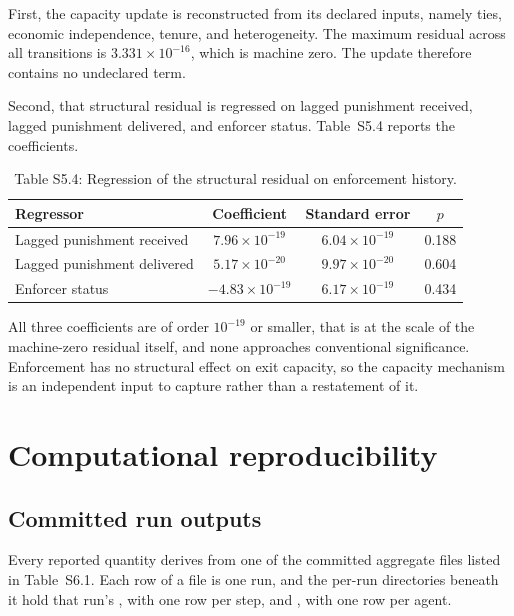 \documentclass[12pt]{article}
\begin{document}
First, the capacity update is reconstructed from its declared inputs, namely
ties, economic independence, tenure, and heterogeneity. The maximum residual
across all transitions is $3.331\times10^{-16}$, which is machine zero. The
update therefore contains no undeclared term.

Second, that structural residual is regressed on lagged punishment received,
lagged punishment delivered, and enforcer status. Table~S5.4 reports the
coefficients.

\begin{table}[htbp]
\centering
\small
\caption{Table S5.4: Regression of the structural residual on enforcement history.}
\begin{tabular}{lccc}
\toprule
Regressor & Coefficient & Standard error & $p$ \\
\midrule
Lagged punishment received & $7.96\times10^{-19}$ & $6.04\times10^{-19}$ & 0.188 \\
Lagged punishment delivered & $5.17\times10^{-20}$ & $9.97\times10^{-20}$ & 0.604 \\
Enforcer status & $-4.83\times10^{-19}$ & $6.17\times10^{-19}$ & 0.434 \\
\bottomrule
\end{tabular}
\end{table}

All three coefficients are of order $10^{-19}$ or smaller, that is at the scale
of the machine-zero residual itself, and none approaches conventional
significance. Enforcement has no structural effect on exit capacity, so the
capacity mechanism is an independent input to capture rather than a restatement
of it.

\clearpage

\section{Computational reproducibility}
\label{sec:repro}

\subsection{Committed run outputs}

Every reported quantity derives from one of the committed aggregate files listed
in Table~S6.1. Each row of a  file is one run, and
the per-run directories beneath it hold that run's , with one
row per step, and , with one row per agent.
\end{document}
